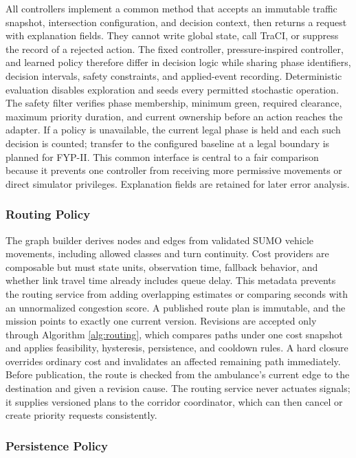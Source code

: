 All controllers implement a common method that accepts an immutable traffic snapshot, intersection configuration, and decision context, then returns a request with explanation fields. They cannot write global state, call TraCI, or suppress the record of a rejected action. The fixed controller, pressure-inspired controller, and learned policy therefore differ in decision logic while sharing phase identifiers, decision intervals, safety constraints, and applied-event recording. Deterministic evaluation disables exploration and seeds every permitted stochastic operation. The safety filter verifies phase membership, minimum green, required clearance, maximum priority duration, and current ownership before an action reaches the adapter. If a policy is unavailable, the current legal phase is held and each such decision is counted; transfer to the configured baseline at a legal boundary is planned for FYP-II. This common interface is central to a fair comparison because it prevents one controller from receiving more permissive movements or direct simulator privileges. Explanation fields are retained for later error analysis.

\subsubsection{Routing Policy}

The graph builder derives nodes and edges from validated SUMO vehicle movements, including allowed classes and turn continuity. Cost providers are composable but must state units, observation time, fallback behavior, and whether link travel time already includes queue delay. This metadata prevents the routing service from adding overlapping estimates or comparing seconds with an unnormalized congestion score. A published route plan is immutable, and the mission points to exactly one current version. Revisions are accepted only through Algorithm \ref{alg:routing}, which compares paths under one cost snapshot and applies feasibility, hysteresis, persistence, and cooldown rules. A hard closure overrides ordinary cost and invalidates an affected remaining path immediately. Before publication, the route is checked from the ambulance's current edge to the destination and given a revision cause. The routing service never actuates signals; it supplies versioned plans to the corridor coordinator, which can then cancel or create priority requests consistently.

\subsubsection{Persistence Policy}

